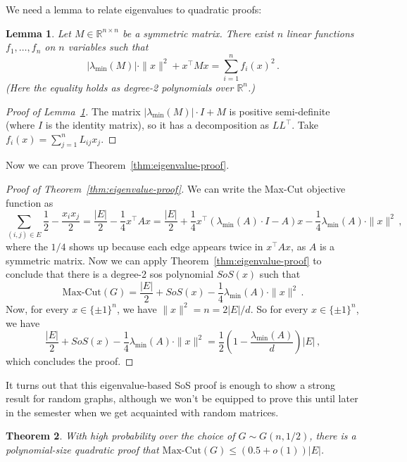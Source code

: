 \documentclass[11pt]{article}
\newtheorem{theorem}{Theorem}
\newtheorem{lemma}[theorem]{Lemma}
\newcommand{\paren}[1]{\left( #1 \right)}
\newcommand{\R}{\mathbb{R}} %
\begin{document}
We need a lemma to relate eigenvalues to quadratic proofs:
\begin{lemma}
\label{lem:operator-norm}
Let $M \in \R^{n \times n}$ be a symmetric matrix.
There exist $n$ linear functions $f_1,\ldots,f_n$ on $n$ variables such that \[ |\lambda_{\min}(M)| \cdot \|x\|^2 + x^\top M x = \sum_{i=1}^n f_i(x)^2 \, .\]
(Here the equality holds as degree-2 polynomials over $\R^n$.)
\end{lemma}
\begin{proof}[Proof of Lemma~\ref{lem:operator-norm}]
    The matrix $|\lambda_{\min}(M)| \cdot I + M$ is positive semi-definite (where $I$ is the identity matrix), so it has a decomposition as $LL^\top$.
    Take $f_i(x) = \sum_{j=1}^n L_{ij} x_j$.
\end{proof}

Now we can prove Theorem~\ref{thm:eigenvalue-proof}.

\begin{proof}[Proof of Theorem~\ref{thm:eigenvalue-proof}]
    We can write the Max-Cut objective function as
    \[\sum_{(i,j) \in E} \frac 12 - \frac{x_i x_j}{2} = \frac{|E|}{2} - \frac 14 x^\top A x = \frac{|E|}{2} + \frac 14 x^\top \paren{\lambda_{\min}(A) \cdot I - A} x - \frac 14 \lambda_{\min}(A) \cdot \|x\|^2 \, ,\]
    where the $1/4$ shows up because each edge appears twice in $x^\top A x$, as $A$ is a symmetric matrix.
    Now we can apply Theorem~\ref{thm:eigenvalue-proof} to conclude that there is a degree-2 sos polynomial $SoS(x)$ such that
    \[
    \text{Max-Cut}(G) = \frac{|E|}{2} + SoS(x) - \frac 14 \lambda_{\min}(A) \cdot \|x\|^2 \, .
    \]
    Now, for every $x \in \{ \pm 1\}^n$, we have $\|x\|^2 = n = 2 |E| / d$.
    So for every $x \in \{ \pm 1\}^n$, we have
    \[
    \frac{|E|}{2} + SoS(x) - \frac 14 \lambda_{\min}(A) \cdot \|x\|^2 = \frac 12 \paren{1 - \frac{\lambda_{\min}(A)}{d}} |E| \, ,
    \]
    which concludes the proof.
\end{proof}

It turns out that this eigenvalue-based SoS proof is enough to show a strong result for random graphs, although we won't be equipped to prove this until later in the semester when we get acquainted with random matrices.

\begin{theorem}
\label{thm:random-graph}
With high probability over the choice of $G \sim G(n,1/2)$, there is a polynomial-size quadratic proof that $\text{Max-Cut}(G) \leq (0.5 + o(1)) |E|$.
\end{theorem}
\end{document}
